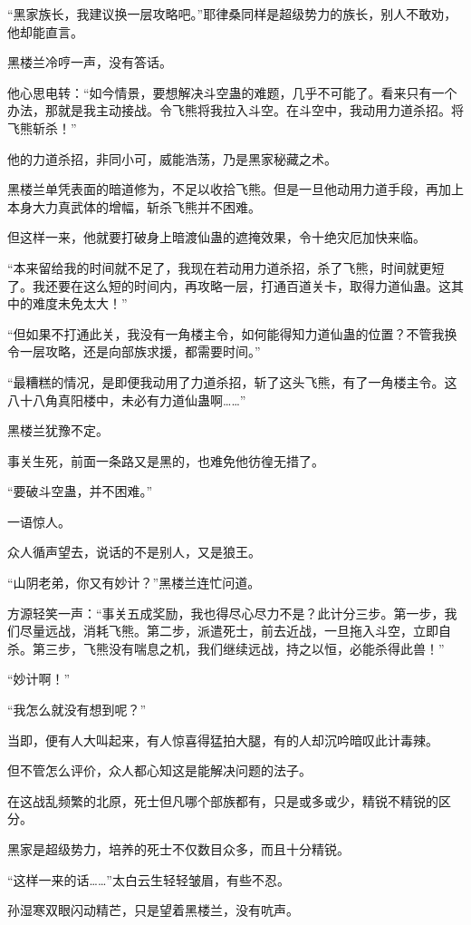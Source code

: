 \begin{this_body}
“黑家族长，我建议换一层攻略吧。”耶律桑同样是超级势力的族长，别人不敢劝，他却能直言。

黑楼兰冷哼一声，没有答话。

他心思电转：“如今情景，要想解决斗空蛊的难题，几乎不可能了。看来只有一个办法，那就是我主动接战。令飞熊将我拉入斗空。在斗空中，我动用力道杀招。将飞熊斩杀！”

他的力道杀招，非同小可，威能浩荡，乃是黑家秘藏之术。

黑楼兰单凭表面的暗道修为，不足以收拾飞熊。但是一旦他动用力道手段，再加上本身大力真武体的增幅，斩杀飞熊并不困难。

但这样一来，他就要打破身上暗渡仙蛊的遮掩效果，令十绝灾厄加快来临。

“本来留给我的时间就不足了，我现在若动用力道杀招，杀了飞熊，时间就更短了。我还要在这么短的时间内，再攻略一层，打通百道关卡，取得力道仙蛊。这其中的难度未免太大！”

“但如果不打通此关，我没有一角楼主令，如何能得知力道仙蛊的位置？不管我换令一层攻略，还是向部族求援，都需要时间。”

“最糟糕的情况，是即便我动用了力道杀招，斩了这头飞熊，有了一角楼主令。这八十八角真阳楼中，未必有力道仙蛊啊……”

黑楼兰犹豫不定。

事关生死，前面一条路又是黑的，也难免他彷徨无措了。

“要破斗空蛊，并不困难。”

一语惊人。

众人循声望去，说话的不是别人，又是狼王。

“山阴老弟，你又有妙计？”黑楼兰连忙问道。

方源轻笑一声：“事关五成奖励，我也得尽心尽力不是？此计分三步。第一步，我们尽量远战，消耗飞熊。第二步，派遣死士，前去近战，一旦拖入斗空，立即自杀。第三步，飞熊没有喘息之机，我们继续远战，持之以恒，必能杀得此兽！”

“妙计啊！”

“我怎么就没有想到呢？”

当即，便有人大叫起来，有人惊喜得猛拍大腿，有的人却沉吟暗叹此计毒辣。

但不管怎么评价，众人都心知这是能解决问题的法子。

在这战乱频繁的北原，死士但凡哪个部族都有，只是或多或少，精锐不精锐的区分。

黑家是超级势力，培养的死士不仅数目众多，而且十分精锐。

“这样一来的话……”太白云生轻轻皱眉，有些不忍。

孙湿寒双眼闪动精芒，只是望着黑楼兰，没有吭声。


\end{this_body}

